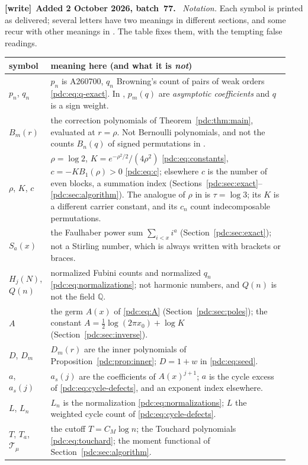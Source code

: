 \documentclass[11pt,letterpaper]{article}
\theoremstyle{remark}\newtheorem{remark}[theorem]{Remark}
\newcommand{\Q}{\mathbb Q}
\newenvironment{writenote}[1][]{\par\smallskip\begingroup\small
 \noindent\textbf{[write]}\if\relax\detokenize{#1}\relax\else~\textbf{#1.}\fi\ }%
 {\par\endgroup\smallskip}
\begin{document}
\begin{writenote}[Added 2 October 2026, batch~77]
\emph{Notation.} Each symbol is printed as delivered; several letters have
two meanings in different sections, and some recur with other meanings in
\cite{pdc-fss}. The table fixes them, with the tempting false readings.
\begin{center}\footnotesize
\begin{tabular}{@{}p{0.14\linewidth}p{0.80\linewidth}@{}}
\toprule
symbol & meaning here (and what it is \emph{not})\\
\midrule
$p_n$, $q_n$ & $p_n$ is A260700, $q_n$ Browning's count of pairs of weak orders \eqref{pdc:eq:q-exact}. In \cite{pdc-fss}, $p_m(q)$ are \emph{asymptotic coefficients} and $q$ is a sign weight.\\
$B_m(r)$ & the correction polynomials of Theorem~\ref{pdc:thm:main}, evaluated at $r=\rho$. Not Bernoulli polynomials, and not the counts $B_n(q)$ of signed permutations in \cite{pdc-fss}.\\
$\rho$, $K$, $c$ & $\rho=\log2$, $K=e^{-\rho^2/2}/(4\rho^2)$ \eqref{pdc:eq:constants}, $c=-KB_1(\rho)>0$ \eqref{pdc:eq:c}; elsewhere $c$ is the number of even blocks, a summation index (Sections~\ref{pdc:sec:exact}--\ref{pdc:sec:algorithm}). The analogue of $\rho$ in \cite{pdc-fss} is $\tau=\log 3$; its $K$ is a different carrier constant, and its $c_n$ count indecomposable permutations.\\
$S_a(x)$ & the Faulhaber power sum $\sum_{i<x}i^a$ (Section~\ref{pdc:sec:exact}); not a Stirling number, which is always written with brackets or braces.\\
$H_j(N)$, $Q(n)$ & normalized Fubini counts and normalized $q_n$ \eqref{pdc:eq:normalizations}; not harmonic numbers, and $Q(n)$ is not the field $\Q$.\\
$A$ & the germ $A(x)$ of \eqref{pdc:eq:A} (Section~\ref{pdc:sec:poles}); the constant $A=\tfrac12\log(2\pi x_0)+\log K$ (Section~\ref{pdc:sec:inverse}).\\
$D$, $D_m$ & $D_m(r)$ are the inner polynomials of Proposition~\ref{pdc:prop:inner}; $D=1+w$ in \eqref{pdc:eq:seed}.\\
$a$, $a_s(j)$ & $a_s(j)$ are the coefficients of $A(x)^{j+1}$; $a$ is the cycle excess of \eqref{pdc:eq:cycle-defects}, and an exponent index elsewhere.\\
$L$, $L_n$ & $L_n$ is the normalization \eqref{pdc:eq:normalizations}; $L$ the weighted cycle count of \eqref{pdc:eq:cycle-defects}.\\
$T$, $T_a$, $\mathcal T_\mu$ & the cutoff $T=C_M\log n$; the Touchard polynomials \eqref{pdc:eq:touchard}; the moment functional of Section~\ref{pdc:sec:algorithm}.\\

\end{tabular}
\end{center}
\end{writenote}
\end{document}

